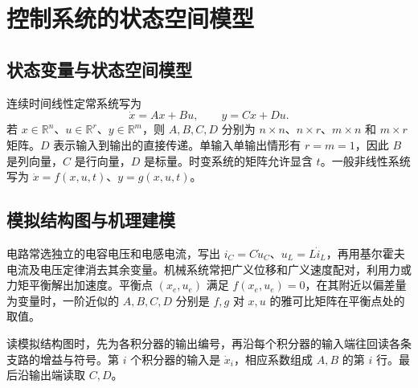 \chapter{控制系统的状态空间模型}
\label{chap:state-space-model}

\section{状态变量与状态空间模型}


连续时间线性定常系统写为
\[
\dot x=Ax+Bu,\qquad y=Cx+Du.
\]
若 $x\in\mathbb R^n$、$u\in\mathbb R^r$、$y\in\mathbb R^m$，则 $A,B,C,D$ 分别为 $n\times n$、$n\times r$、$m\times n$ 和 $m\times r$ 矩阵。$D$ 表示输入到输出的直接传递。单输入单输出情形有 $r=m=1$，因此 $B$ 是列向量，$C$ 是行向量，$D$ 是标量。时变系统的矩阵允许显含 $t$。一般非线性系统写为 $\dot x=f(x,u,t)$、$y=g(x,u,t)$。


\section{模拟结构图与机理建模}

电路常选独立的电容电压和电感电流，写出 $i_C=C\dot u_C$、$u_L=L\dot i_L$，再用基尔霍夫电流及电压定律消去其余变量。机械系统常把广义位移和广义速度配对，利用力或力矩平衡解出加速度。平衡点 $(x_e,u_e)$ 满足 $f(x_e,u_e)=0$，在其附近以偏差量为变量时，一阶近似的 $A,B,C,D$ 分别是 $f,g$ 对 $x,u$ 的雅可比矩阵在平衡点处的取值。

读模拟结构图时，先为各积分器的输出编号，再沿每个积分器的输入端往回读各条支路的增益与符号。第 $i$ 个积分器的输入是 $\dot x_i$，相应系数组成 $A,B$ 的第 $i$ 行。最后沿输出端读取 $C,D$。



